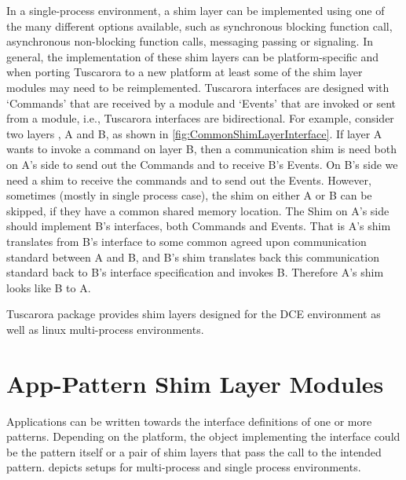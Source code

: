 In a single-process environment, a shim layer can be implemented using one of the many different options available, such as synchronous blocking function call, asynchronous non-blocking function calls, messaging passing or signaling.
In general, the implementation of these shim layers can be platform-specific and when porting Tuscarora to a new platform at least some of the shim layer modules may need to be reimplemented.
Tuscarora interfaces are designed with `Commands' that are received by a module and `Events' that are invoked or sent from a module, i.e., Tuscarora interfaces are bidirectional. For example, consider two layers , A and B, as shown in \cref{fig:CommonShimLayerInterface}. 
If layer A wants to invoke a command on layer B, then a communication shim is need both on A's side to send out the Commands and to receive  B's Events. On B's side we need a shim to receive the commands and to send out the Events. 
However, sometimes (mostly in single process case), the shim on either A or B can be skipped, if they have a common shared memory location. 
The Shim on A's side should implement B's interfaces, both Commands and Events. 
That is A's shim translates from B's interface to some common agreed upon communication standard between A and B, and B's shim translates back this communication standard back to B's interface specification and invokes B.  Therefore A's shim looks like B to A.


Tuscarora package provides shim layers designed for the DCE environment as well as linux multi-process environments. 

\section{App-Pattern Shim Layer Modules}

Applications can be written towards the interface definitions of one or more patterns. 
Depending on the platform, the object implementing the interface could be the pattern itself or a pair of shim layers that pass the call to the intended pattern.  depicts setups for multi-process and single process environments. 

